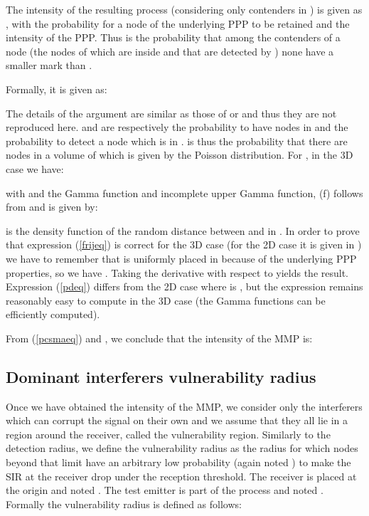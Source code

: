 \documentclass{sig-alternate-05-2015}
\begin{document}
The intensity of the resulting process (considering only contenders in ) is given as  \cite{stoyan87}, with  the probability for a node of the underlying PPP to be retained and  the intensity of the PPP. Thus  is the probability that among the contenders of a node  (the nodes of  which are inside  and that are detected by ) none have a smaller mark than .

Formally, it is given as:



The details of the argument are similar as those of \cite{nguyen07} or \cite{elsawy13} and thus they are not reproduced here.  and  are respectively the probability to have  nodes in  and the probability to detect a node which is in .  is thus the probability that there are  nodes in a volume of  which is given by the Poisson distribution. For , in the 3D case we have:

with  and  the Gamma function and incomplete upper Gamma function, (f) follows from   and  is given by:


 is the density function of the random distance between  and  in . In order to prove that expression (\ref{frijeq}) is correct for the 3D case (for the 2D case it is given in \cite{sousa90}) we have to remember that  is uniformly placed in  because of the underlying PPP properties, so we have . Taking the derivative with respect to  yields the result. Expression (\ref{pdeq}) differs from the 2D case where  is  \cite{sousa90}, but the expression remains reasonably easy to compute in the 3D case (the Gamma functions can be efficiently computed).

From (\ref{pcsmaeq}) and , we conclude that the intensity of the MMP is:



\subsection{Dominant interferers vulnerability radius}

Once we have obtained the intensity of the MMP, we consider only the interferers which can corrupt the signal on their own and we assume that they all lie in a region around the receiver, called the vulnerability region. Similarly to the detection radius, we define the vulnerability radius as the radius for which nodes beyond that limit have an arbitrary low probability (again noted ) to make the SIR at the receiver drop under the reception threshold. The receiver is placed at the origin and noted . The test emitter is part of the process and noted . Formally the vulnerability radius is defined as follows:
\end{document}
